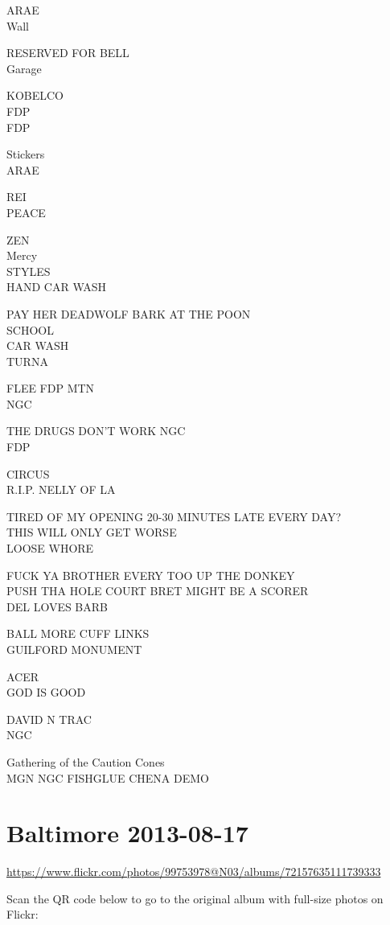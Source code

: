 \documentclass[10pt,letterpaper]{article}
\begin{document}
ARAE\\
Wall

RESERVED FOR BELL\\
Garage

KOBELCO\\
FDP\\
FDP

Stickers\\
ARAE

REI\\
PEACE

ZEN\\
Mercy\\
STYLES\\
HAND CAR WASH

PAY HER DEADWOLF BARK AT THE POON\\
SCHOOL\\
CAR WASH\\
TURNA

FLEE FDP MTN\\
NGC

THE DRUGS DON'T WORK NGC\\
FDP

CIRCUS\\
R.I.P. NELLY OF LA

TIRED OF MY OPENING 20{-}30 MINUTES LATE EVERY DAY?\\
THIS WILL ONLY GET WORSE\\
LOOSE WHORE

FUCK YA BROTHER EVERY TOO UP THE DONKEY\\
PUSH THA HOLE COURT BRET MIGHT BE A SCORER\\
DEL LOVES BARB

BALL MORE CUFF LINKS\\
GUILFORD MONUMENT

ACER\\
GOD IS GOOD

DAVID N TRAC\\
NGC

Gathering of the Caution Cones\\
MGN NGC FISHGLUE CHENA DEMO
\

\section*{Baltimore 2013-08-17}

\url{https://www.flickr.com/photos/99753978@N03/albums/72157635111739333}

Scan the QR code below to go to the original album with full-size photos on Flickr:
\end{document}

